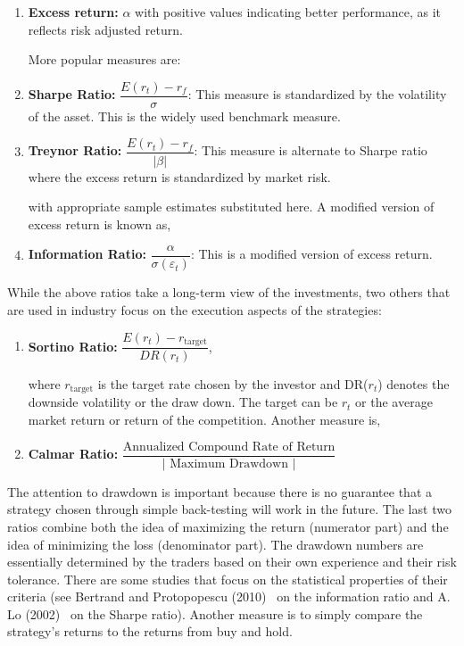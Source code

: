 \begin{enumerate}[--]
\item \textbf{Excess return: }$\alpha$ with positive values indicating better performance, as it reflects risk adjusted return. \twomedskip

\noindent More popular measures are: \twomedskip

\item \textbf{Sharpe Ratio: } $\dfrac{E(r_{t}) - r_f}{\sigma}$: This measure is standardized by the volatility of the asset. This is the widely used benchmark measure. \twomedskip

\item \textbf{Treynor Ratio: } $\dfrac{E(r_{t}) - r_f}{\left|\beta \right|}$: This measure is alternate to Sharpe ratio where the excess return is standardized by market risk. \twomedskip

\noindent with appropriate sample estimates substituted here. A modified version of excess return is known as, \twomedskip

\item \textbf{Information Ratio: } $\dfrac{\alpha}{\sigma(\varepsilon_{t})}$: This is a modified version of excess return.
\end{enumerate}


While the above ratios take a long-term view of the investments, two others that are used in industry focus on the execution aspects of the strategies: 


\begin{enumerate}[--]
\item \textbf{Sortino Ratio: } $\dfrac{E(r_{t}) - r_{\text{target}}}{DR(r_{t})}$, \twomedskip

\noindent where $r_{\text{target}}$ is the target rate chosen by the investor and DR($r_t$) denotes the downside volatility or the draw down. The target can be $r_t$ or the average market return or return of the competition. Another measure is, \twomedskip

\item \textbf{Calmar Ratio: } $\dfrac{\text{Annualized Compound Rate of Return}}{\left| \text{ Maximum Drawdown }\right|}$ \twomedskip
\end{enumerate}


The attention to drawdown is important because there is no guarantee that a strategy chosen through simple back-testing will work in the future. The last two ratios combine both the idea of maximizing the return (numerator part) and the idea of minimizing the loss (denominator part). The drawdown numbers are essentially determined by the traders based on their own experience and their risk tolerance. There are some studies that focus on the statistical properties of their criteria (see Bertrand and Protopopescu (2010)~\cite{bertrand} on the information ratio and A. Lo (2002)~\cite{awlo} on the Sharpe ratio). Another measure is to simply compare the strategy's returns to the returns from buy and hold.


